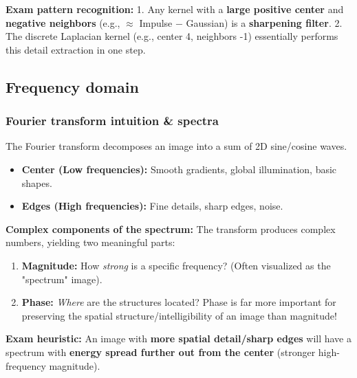 \documentclass[11pt,a4paper]{article}
\begin{document}
\begin{notebox}
\textbf{Exam pattern recognition:} 
1. Any kernel with a \textbf{large positive center} and \textbf{negative neighbors} (e.g., $\approx$ Impulse $-$ Gaussian) is a \textbf{sharpening filter}.
2. The discrete Laplacian kernel (e.g., center 4, neighbors -1) essentially performs this detail extraction in one step.
\end{notebox}

\subsection{Frequency domain}
\subsubsection{Fourier transform intuition \& spectra}

\begin{defbox}
The Fourier transform decomposes an image into a sum of 2D sine/cosine waves. 
\begin{itemize}
  \item \textbf{Center (Low frequencies):} Smooth gradients, global illumination, basic shapes.
  \item \textbf{Edges (High frequencies):} Fine details, sharp edges, noise.
\end{itemize}
\end{defbox}

\begin{mathrule}
\textbf{Complex components of the spectrum:}
The transform produces complex numbers, yielding two meaningful parts:
\begin{enumerate}
  \item \textbf{Magnitude:} How \emph{strong} is a specific frequency? (Often visualized as the "spectrum" image).
  \item \textbf{Phase:} \emph{Where} are the structures located? Phase is far more important for preserving the spatial structure/intelligibility of an image than magnitude!
\end{enumerate}
\end{mathrule}

\begin{notebox}
\textbf{Exam heuristic:} An image with \textbf{more spatial detail/sharp edges} will have a spectrum with \textbf{energy spread further out from the center} (stronger high-frequency magnitude).
\end{notebox}
\end{document}
